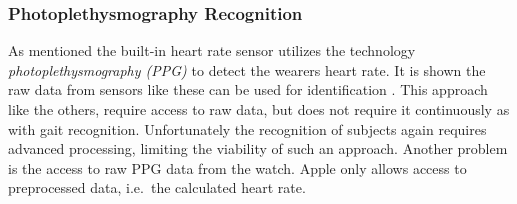 \subsubsection{Photoplethysmography Recognition}
As mentioned the built-in heart rate sensor utilizes the technology
\textit{photoplethysmography (PPG)} to detect the wearers heart rate. It is shown the
raw data from sensors like these can be used for identification
\cite{kavsaoglu2013a}. This approach like the others, require access to raw
data, but does not require it continuously as with gait recognition.
Unfortunately the recognition of subjects again requires advanced processing,
limiting the viability of such an approach. Another problem is the access to raw
PPG data from the watch. Apple only allows access to preprocessed data, i.e.\
the calculated heart rate. 
